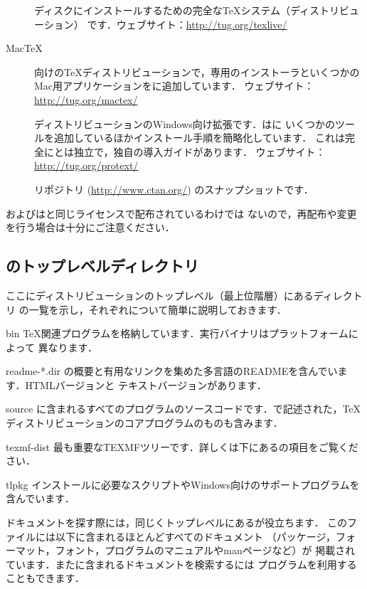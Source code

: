 \documentclass[uplatex,dvipdfmx]{jsarticle}
\begin{document}
\begin{description}
\item[\TL]
ディスクにインストールするための完全な\TeX システム（ディストリビューション）
です．ウェブサイト：\url{http://tug.org/texlive/}

\item[Mac\TeX]
\macOS 向けの\TeX ディストリビューションで，専用のインストーラといくつかの
Mac用アプリケーションを\TL に追加しています．
ウェブサイト：\url{http://tug.org/mactex/}

\item[\ProTeXt]
\MIKTEX ディストリビューションのWindows向け拡張です．\ProTeXt は\MIKTEX に
いくつかのツールを追加しているほかインストール手順を簡略化しています．
これは完全に\TL とは独立で，独自の導入ガイドがあります．
ウェブサイト：\url{http://tug.org/protext/}

\item[\CTAN]
\CTAN リポジトリ (\url{http://www.ctan.org/}) のスナップショットです．
\end{description}

\CTAN およびは\TL と同じライセンスで配布されているわけでは
ないので，再配布や変更を行う場合は十分にご注意ください．

\subsection{\TL のトップレベルディレクトリ}
\label{sec:tld}

ここに\TL ディストリビューションのトップレベル（最上位階層）にあるディレクトリ
の一覧を示し，それぞれについて簡単に説明しておきます．
%
\begin{ttdescription}
\item[bin]
\TeX 関連プログラムを格納しています．実行バイナリはプラットフォームによって
異なります．

\item[readme-*.dir]
\TL の概要と有用なリンクを集めた多言語のREADMEを含んでいます．HTMLバージョンと
テキストバージョンがあります．

\item[source]
\TL に含まれるすべてのプログラムのソースコードです．\Webc で記述された，\TeX
ディストリビューションのコアプログラムのものも含みます．

\item[texmf-dist]
最も重要なTEXMFツリーです．詳しくは下にあるの項目をご覧ください．

\item[tlpkg]
インストールに必要なスクリプトやWindows向けのサポートプログラムを含んでいます．
\end{ttdescription}
%
%
ドキュメントを探す際には，同じくトップレベルにあるが役立ちます．
このファイルには以下に含まれるほとんどすべてのドキュメント
（パッケージ，フォーマット，フォント，プログラムのマニュアルやmanページなど）が
掲載されています．また\TL に含まれるドキュメントを検索するには%
プログラムを利用することもできます．
\end{document}
